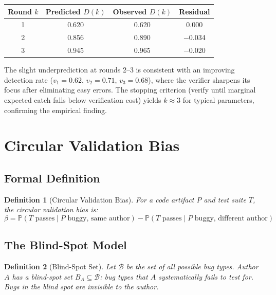 \documentclass[11pt, a4paper, logo, copyright]{googledeepmind}
\newtheorem{definition}{Definition}[section]
\newcommand{\Prob}{\mathbb{P}}
\newcommand{\calB}{\mathcal{B}}
\begin{document}
\begin{center}
\begin{tabular}{cccc}
\toprule
Round $k$ & Predicted $D(k)$ & Observed $D(k)$ & Residual \\
\midrule
1 & 0.620 & 0.620 & 0.000 \\
2 & 0.856 & 0.890 & $-$0.034 \\
3 & 0.945 & 0.965 & $-$0.020 \\
\bottomrule
\end{tabular}
\end{center}

The slight underprediction at rounds 2--3 is consistent with an improving detection rate ($v_1 = 0.62$, $v_2 = 0.71$, $v_3 = 0.68$), where the verifier sharpens its focus after eliminating easy errors.
The stopping criterion (verify until marginal expected catch falls below verification cost) yields $k \approx 3$ for typical parameters, confirming the empirical finding.

\section{Circular Validation Bias}
\label{sec:circular}

\subsection{Formal Definition}

\begin{definition}[Circular Validation Bias]
For a code artifact $P$ and test suite $T$, the \emph{circular validation bias} is:
\begin{equation}
\beta = \Prob(T \text{ passes} \mid P \text{ buggy, same author}) - \Prob(T \text{ passes} \mid P \text{ buggy, different author})
\end{equation}
\end{definition}

\subsection{The Blind-Spot Model}

\begin{definition}[Blind-Spot Set]
Let $\calB$ be the set of all possible bug types.
Author $A$ has a blind-spot set $B_A \subseteq \calB$: bug types that $A$ systematically fails to test for.
Bugs in the blind spot are invisible to the author.
\end{definition}
\end{document}
